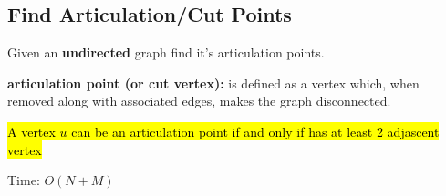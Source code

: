 \subsection{Find Articulation/Cut Points}

Given an \textbf{undirected} graph find it's articulation points.

\textbf{articulation point (or cut vertex):} is defined as a vertex which, when removed along with associated edges, makes the graph disconnected. 

\hl{A vertex $u$ can be an articulation point if and only if has at least 2 adjascent vertex}

Time: $O(N+M)$
